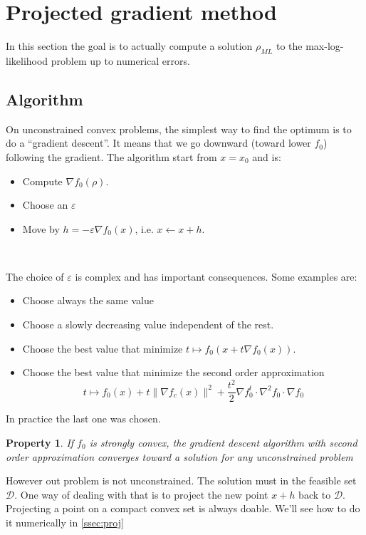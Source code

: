 \documentclass[10pt,a4paper]{report}
\theoremstyle{plain}
\newtheorem{prop}[thm]{Property}
\theoremstyle{definition}
\theoremstyle{remark}
\newcommand{\ml}{_{M\!L}}
\begin{document}
\section{Projected gradient method}\label{sec:projgrad}

In this section the goal is to actually compute a solution $\rho\ml$ to the
max-log-likelihood problem up to
numerical errors.

\subsection{Algorithm}

On unconstrained convex problems, the simplest way to find the optimum is to do a
``gradient descent''. It means that we go downward (toward lower $f_0$)
following the gradient. The algorithm start from $x = x_0$ and is:

\begin{itemize}
\item Compute $\nabla f_0(\rho)$.
\item Choose an $\varepsilon$
\item Move by $h = -\varepsilon \nabla f_0(x)$, i.e. $x \leftarrow x + h$.
\end{itemize}

\

\noindent The choice of $\varepsilon$ is complex and has important consequences.
Some examples are:
\begin{itemize}
\item Choose always the same value
\item Choose a slowly decreasing value independent of the rest.
\item Choose the best value that minimize $t \mapsto f_0(x + t\nabla f_0(x))$.
\item Choose the best value that minimize the second order approximation
  \[t \mapsto f_0(x) + t\|\nabla f_c(x)\|^2 + \frac {t^2} 2 \nabla f_0^t \cdot
  \nabla^2\!f_0 \cdot \nabla f_0\]
\end{itemize}

In practice the last one was chosen.
\begin{prop}
  If $f_0$ is strongly convex,
  the gradient descent algorithm with second order approximation converges
  toward a solution for any unconstrained problem
\end{prop}

However out problem is not unconstrained. The solution must in the feasible set
$\mathcal{D}$. One way of dealing with that is to project the new point $x + h$
back to $\mathcal{D}$. Projecting a point on a compact convex set is always
doable. We'll see how to do it numerically in \cref{ssec:proj}
\end{document}
